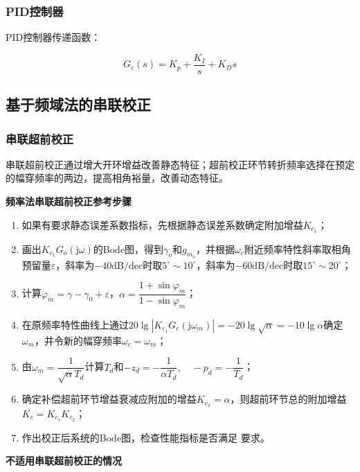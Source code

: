 \documentclass[cn, blue, normal, 12pt]{elegantnote}
\begin{document}
\subsubsection{PID控制器}

PID控制器传递函数：

\begin{equation}
    G_c(s)=K_p+\frac{K_I}{s}+K_D s
\end{equation}

\subsection{基于频域法的串联校正}

\subsubsection{串联超前校正}

串联超前校正通过增大开环增益改善静态特征；超前校正环节转折频率选择在预定的幅穿频率的两边，提高相角裕量，改善动态特征。

\textbf{频率法串联超前校正参考步骤}

\begin{enumerate}
    \setlength{\itemsep}{6pt}
    \item 如果有要求静态误差系数指标，先根据静态误差系数确定附加增益$K_{c_1}$；
    \item 画出$K_{c_1}G_o(\mathrm{j}\omega)$的Bode图，得到$\gamma_o$和$g_{m_o}$，并根据$\omega_c$附近频率特性斜率取相角预留量$\varepsilon$，斜率为$-40\mathrm{dB/dec}$时取$5^{\circ}\sim 10^{\circ}$，斜率为$-60\mathrm{dB/dec}$时取$15^{\circ}\sim 20^{\circ}$；
    \item 计算$\varphi_m=\gamma-\gamma_0+\varepsilon$，$\alpha=\dfrac{1+\sin{\varphi_m}}{1-\sin{\varphi_m}}$；
    \item 在原频率特性曲线上通过$20\lg{|K_{c_1}G_c(\mathrm{j}\omega_m)|}=-20\lg{\sqrt{\alpha}}=-10\lg{\alpha}$确定$\omega_m$，并令新的幅穿频率$\omega_c=\omega_m$；
    \item 由$\omega_m=\dfrac{1}{\sqrt{\alpha}T_d}$计算$T_d$和$-z_d=-\dfrac{1}{\alpha T_d}, \quad -p_d=-\dfrac{1}{T_d}$；
    \item 确定补偿超前环节增益衰减应附加的增益$K_{c_2}=\alpha$，则超前环节总的附加增益$K_c=K_{c_1}K_{c_2}$；
    \item 作出校正后系统的Bode图，检查性能指标是否满足
    要求。
\end{enumerate}

\textbf{不适用串联超前校正的情况}
\end{document}
